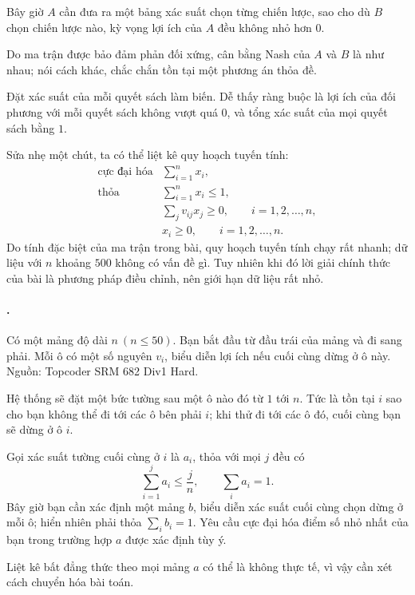 \documentclass[11pt]{article}
\begin{document}
Bây giờ \(A\) cần đưa ra một bảng xác suất chọn từng chiến lược, sao cho dù
\(B\) chọn chiến lược nào, kỳ vọng lợi ích của \(A\) đều không nhỏ hơn \(0\).

Do ma trận được bảo đảm phản đối xứng, cân bằng Nash của \(A\) và \(B\) là như
nhau; nói cách khác, chắc chắn tồn tại một phương án thỏa đề.

Đặt xác suất của mỗi quyết sách làm biến. Dễ thấy ràng buộc là lợi ích của
đối phương với mỗi quyết sách không vượt quá \(0\), và tổng xác suất của mọi
quyết sách bằng \(1\).

Sửa nhẹ một chút, ta có thể liệt kê quy hoạch tuyến tính:
\[
\begin{array}{ll}
\text{cực đại hóa} & \displaystyle \sum_{i=1}^{n}x_i,\\[0.4em]
\text{thỏa} & \displaystyle \sum_{i=1}^{n}x_i\le 1,\\[0.4em]
& \displaystyle \sum_j v_{ij}x_j\ge 0,\qquad i=1,2,\ldots,n,\\[0.4em]
& x_i\ge 0,\qquad i=1,2,\ldots,n.
\end{array}
\]
Do tính đặc biệt của ma trận trong bài, quy hoạch tuyến tính chạy rất nhanh;
dữ liệu với \(n\) khoảng \(500\) không có vấn đề gì. Tuy nhiên khi đó lời giải
chính thức của bài là phương pháp điều chỉnh, nên giới hạn dữ liệu rất nhỏ.

\paragraph{.}
Có một mảng độ dài \(n\ (n\le 50)\). Bạn bắt đầu từ đầu trái của mảng và đi
sang phải. Mỗi ô có một số nguyên \(v_i\), biểu diễn lợi ích nếu cuối cùng
dừng ở ô này. Nguồn: Topcoder SRM 682 Div1 Hard.

Hệ thống sẽ đặt một bức tường sau một ô nào đó từ \(1\) tới \(n\). Tức là tồn
tại \(i\) sao cho bạn không thể đi tới các ô bên phải \(i\); khi thử đi tới
các ô đó, cuối cùng bạn sẽ dừng ở ô \(i\).

Gọi xác suất tường cuối cùng ở \(i\) là \(a_i\), thỏa với mọi \(j\) đều có
\[
  \sum_{i=1}^{j}a_i\le \frac{j}{n},\qquad \sum_i a_i=1.
\]
Bây giờ bạn cần xác định một mảng \(b\), biểu diễn xác suất cuối cùng chọn
dừng ở mỗi ô; hiển nhiên phải thỏa \(\sum_i b_i=1\). Yêu cầu cực đại hóa điểm
số nhỏ nhất của bạn trong trường hợp \(a\) được xác định tùy ý.

Liệt kê bất đẳng thức theo mọi mảng \(a\) có thể là không thực tế, vì vậy cần
xét cách chuyển hóa bài toán.
\end{document}
